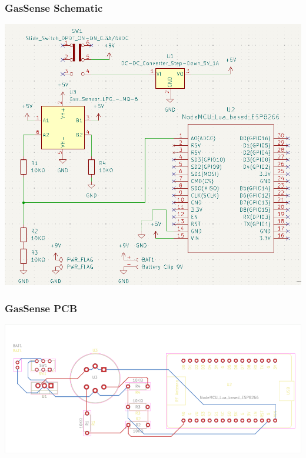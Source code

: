 \documentclass{beamer}
\begin{document}
\begin{frame}
\frametitle{GasSense Schematic}
	\centerline{\includegraphics[height=0.6\textwidth]{assets/gassense-schematic}}
\end{frame}
\begin{frame}
\frametitle{GasSense PCB}
	\colorbox{PineGreen}{\centerline{\includegraphics[height=0.4\textwidth]{assets/GasSense-brd}}}
\end{frame}
\end{document}
